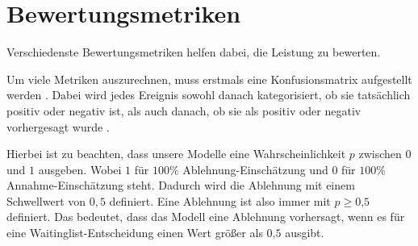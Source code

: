 \pagebreak
\section{Bewertungsmetriken}


Verschiedenste Bewertungsmetriken helfen dabei, die Leistung zu bewerten.



Um viele Metriken auszurechnen, muss erstmals eine Konfusionsmatrix aufgestellt werden \cite{Swaminathan2024}. 
Dabei wird jedes Ereignis sowohl danach kategorisiert, ob sie tatsächlich positiv oder negativ ist, als auch danach, ob sie als positiv oder negativ vorhergesagt wurde \cite{Swaminathan2024}.
\begin{table}[H]
    \centering
    \caption{Konfusionsmatrix}
    \label{tab:confusion_matrix}
\end{table}

Hierbei ist zu beachten, dass unsere Modelle eine Wahrscheinlichkeit $p$ zwischen $0$ und $1$ ausgeben. Wobei $1$ für $100\%$ Ablehnung-Einschätzung und $0$ für $100\%$ Annahme-Einschätzung steht. Dadurch wird die Ablehnung mit einem Schwellwert von $0,5$ definiert. Eine Ablehnung ist also immer mit $p \geq 0\text{,}5$ definiert. 
Das bedeutet, dass das Modell eine Ablehnung vorhersagt, wenn es für eine Waitinglist-Entscheidung einen Wert größer als $0\text{,}5$ ausgibt.

